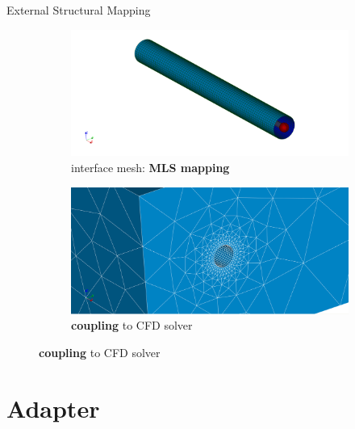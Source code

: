 \documentclass[10pt,t]{beamer}
\begin{document}
\begin{frame}{External Structural Mapping}
\begin{figure}
  \begin{subfigure}[t]{.486\textwidth}
    \centering
    \includegraphics[width=\linewidth]{images/mesh_1b.png}
    \caption{interface mesh: \textbf{MLS mapping}}
  \end{subfigure}
  \hfill
  \begin{subfigure}[t]{.486\textwidth}
    \centering
    \includegraphics[width=\linewidth]{images/whole_1aa.png}
    \caption{\textbf{coupling} to CFD solver}
  \end{subfigure}
\end{figure}


\end{frame}





\section{Adapter}
\end{document}
